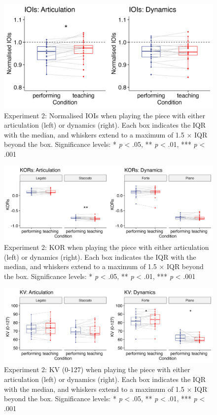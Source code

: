\documentclass[
  english,
  man,floatsintext]{apa6}
\begin{document}
\begin{figure}
\includegraphics[width=1\linewidth]{manuscript_files/figure-latex/plot-ioi-2-1} \caption{\label{fig:ioi-2}Experiment 2: Normalised IOIs when playing the piece with either articulation (left) or dynamics (right). Each box indicates the IQR with the median, and whiskers extend to a maximum of 1.5 × IQR beyond the box. Significance levels: * \textit{p} < .05, ** \textit{p} < .01, *** \textit{p} < .001}\label{fig:plot-ioi-2}
\end{figure}

\begin{figure}
\includegraphics[width=1\linewidth]{manuscript_files/figure-latex/plot-kor-2-1} \caption{\label{fig:kor-2}Experiment 2: KOR when playing the piece with either articulation (left) or dynamics (right). Each box indicates the IQR with the median, and whiskers extend to a maximum of 1.5 × IQR beyond the box. Significance levels: * \textit{p} < .05, ** \textit{p} < .01, *** \textit{p} < .001}\label{fig:plot-kor-2}
\end{figure}

\begin{figure}
\includegraphics[width=1\linewidth]{manuscript_files/figure-latex/plot-vel-2-1} \caption{\label{fig:vel-2}Experiment 2: KV (0-127) when playing the piece with either articulation (left) or dynamics (right). Each box indicates the IQR with the median, and whiskers extend to a maximum of 1.5 × IQR beyond the box. Significance levels: * \textit{p} < .05, ** \textit{p} < .01, *** \textit{p} < .001}\label{fig:plot-vel-2}
\end{figure}
\end{document}
